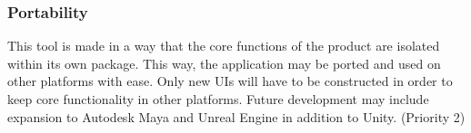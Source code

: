 \subsubsection{Portability}
This tool is made in a way that the core functions of the product are isolated within its own package. This way, the application may be ported and used on other platforms with ease. Only new UIs will have to be constructed in order to keep core functionality in other platforms. Future development may include expansion to Autodesk Maya and Unreal Engine in addition to Unity. (Priority 2) 
